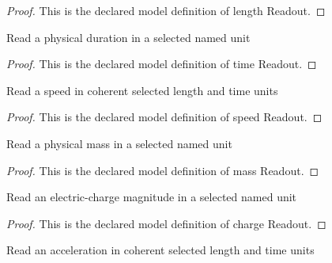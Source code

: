 \begin{proof}
  This is the declared model definition of length Readout.
\end{proof}
\begin{definition}
  \label{def:physics:phyx-mini-0836:phyxminiproblems-problemphyxmini0836-timereadout}
  Read a physical duration in a selected named unit
\end{definition}
\begin{proof}
  This is the declared model definition of time Readout.
\end{proof}
\begin{definition}
  \label{def:physics:phyx-mini-0836:phyxminiproblems-problemphyxmini0836-speedreadout}
  Read a speed in coherent selected length and time units
\end{definition}
\begin{proof}
  This is the declared model definition of speed Readout.
\end{proof}
\begin{definition}
  \label{def:physics:phyx-mini-0836:phyxminiproblems-problemphyxmini0836-massreadout}
  Read a physical mass in a selected named unit
\end{definition}
\begin{proof}
  This is the declared model definition of mass Readout.
\end{proof}
\begin{definition}
  \label{def:physics:phyx-mini-0836:phyxminiproblems-problemphyxmini0836-chargereadout}
  Read an electric-charge magnitude in a selected named unit
\end{definition}
\begin{proof}
  This is the declared model definition of charge Readout.
\end{proof}
\begin{definition}
  \label{def:physics:phyx-mini-0836:phyxminiproblems-problemphyxmini0836-accelerationreadout}
  Read an acceleration in coherent selected length and time units
\end{definition}
